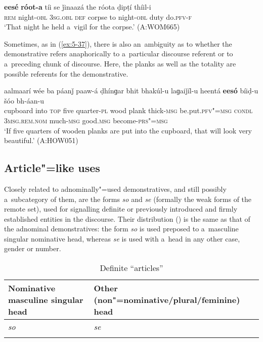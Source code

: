 \begin{exe}
\ex
\label{ex:5-36}
\gll \textbf{eesé} \textbf{róot-a} tíi se ǰinaazá the róota ḍipṭí thíil-i\\
\textsc{rem} night-\textsc{obl} \textsc{3sg.obl} \textsc{def} corpse to night-\textsc{obl} duty do.\textsc{pfv-f}\\
\glt `That night he held a~vigil for the corpse.' (A:WOM665)
\end{exe}

Sometimes, as in (\ref{ex:5-37}), there is also an~ambiguity as to whether the demonstrative refers anaphorically to a~particular discourse referent or to a~preceding chunk of discourse. Here, the planks as well as the totality are possible referents for the demonstrative.

\begin{exe}
\ex
\label{ex:5-37}
\gll aalmaarí wée ba páanǰ paaw-á ḍhínɡar bhit bhakúl-u laɡaiǰíl-u heentá \textbf{eesó} bíiḍ-u šóo bh-áan-u \\
cupboard into \textsc{top} five quarter-\textsc{pl} wood plank thick-\textsc{msg} be.put.\textsc{pfv"=msg} \textsc{condl} \textsc{3msg.rem.nom} much-\textsc{msg} good.\textsc{msg} become-\textsc{prs"=msg}\\
\glt `If five quarters of wooden planks are put into the cupboard, that will look very beautiful.'
(A:HOW051)
\end{exe}



\subsection{Article"=like uses}
\label{subsec:5-2-6}

Closely related to adnominally"=used demonstratives, and still possibly a~subcategory of them, are the forms \textit{so} and \textit{se} (formally the weak forms of the remote set), used for signalling definite or previously introduced and firmly established entities in the discourse. Their distribution () is the same as that of the adnominal demonstratives: the form \textit{so} is used preposed to a~masculine singular nominative head, whereas \textit{se} is used with a~head in any other case, gender or number. 


\begin{table}[ht]
 \caption{Definite ``articles''}
\begin{tabularx}{\textwidth}{ Q Q }
\lsptoprule
Nominative masculine singular head &
Other (non"=nominative/plural/feminine) head\\\midrule
\textit{so} &
\textit{se} \\\lspbottomrule
\end{tabularx}
\label{tab:5-5}
\end{table}

